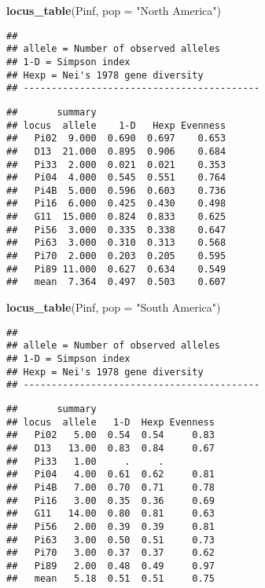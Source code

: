 \documentclass[12pt,]{krantz}
\newenvironment{Shaded}{\begin{snugshade}}{\end{snugshade}}
\newcommand{\KeywordTok}[1]{\textcolor[rgb]{0.27,0.27,0.27}{\textbf{#1}}}
\newcommand{\DataTypeTok}[1]{\textcolor[rgb]{0.27,0.27,0.27}{#1}}
\newcommand{\StringTok}[1]{\textcolor[rgb]{0.5,0.5,0.5}{#1}}
\newcommand{\NormalTok}[1]{#1}
\theoremstyle{definition}
\theoremstyle{definition}
\theoremstyle{definition}
\theoremstyle{remark}
\begin{document}
\begin{Shaded}
\begin{Highlighting}[]
\KeywordTok{locus_table}\NormalTok{(Pinf, }\DataTypeTok{pop =} \StringTok{"North America"}\NormalTok{)}
\end{Highlighting}
\end{Shaded}

\begin{verbatim}
## 
## allele = Number of observed alleles
## 1-D = Simpson index
## Hexp = Nei's 1978 gene diversity
## ------------------------------------------
\end{verbatim}

\begin{verbatim}
##       summary
## locus  allele    1-D   Hexp Evenness
##   Pi02  9.000  0.690  0.697    0.653
##   D13  21.000  0.895  0.906    0.684
##   Pi33  2.000  0.021  0.021    0.353
##   Pi04  4.000  0.545  0.551    0.764
##   Pi4B  5.000  0.596  0.603    0.736
##   Pi16  6.000  0.425  0.430    0.498
##   G11  15.000  0.824  0.833    0.625
##   Pi56  3.000  0.335  0.338    0.647
##   Pi63  3.000  0.310  0.313    0.568
##   Pi70  2.000  0.203  0.205    0.595
##   Pi89 11.000  0.627  0.634    0.549
##   mean  7.364  0.497  0.503    0.607
\end{verbatim}

\begin{Shaded}
\begin{Highlighting}[]
\KeywordTok{locus_table}\NormalTok{(Pinf, }\DataTypeTok{pop =} \StringTok{"South America"}\NormalTok{)}
\end{Highlighting}
\end{Shaded}

\begin{verbatim}
## 
## allele = Number of observed alleles
## 1-D = Simpson index
## Hexp = Nei's 1978 gene diversity
## ------------------------------------------
\end{verbatim}

\begin{verbatim}
##       summary
## locus  allele   1-D  Hexp Evenness
##   Pi02   5.00  0.54  0.54     0.83
##   D13   13.00  0.83  0.84     0.67
##   Pi33   1.00     .     .         
##   Pi04   4.00  0.61  0.62     0.81
##   Pi4B   7.00  0.70  0.71     0.78
##   Pi16   3.00  0.35  0.36     0.69
##   G11   14.00  0.80  0.81     0.63
##   Pi56   2.00  0.39  0.39     0.81
##   Pi63   3.00  0.50  0.51     0.73
##   Pi70   3.00  0.37  0.37     0.62
##   Pi89   2.00  0.48  0.49     0.97
##   mean   5.18  0.51  0.51     0.75
\end{verbatim}
\end{document}
